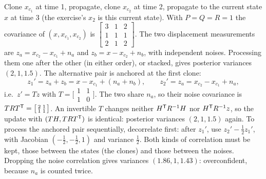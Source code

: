 \begin{solutions}
  \item Clone $x_{c_1}$ at time 1, propagate, clone $x_{c_2}$ at time 2, propagate to the current state $x$ at time 3 (the exercise's $x_2$ is this current state). With
        $P = Q = R = 1$ the covariance of $(x, x_{c_1}, x_{c_2})$ is $\left[\begin{smallmatrix} 3 & 1 & 2 \\ 1 & 1 & 1 \\ 2 & 1 & 2\end{smallmatrix}\right]$. The two displacement measurements
        are $z_a = x_{c_2} - x_{c_1} + n_a$ and $z_b = x - x_{c_2} + n_b$, with independent noises. Processing them one after the other (in either order), or stacked, gives
        posterior variances $(2, 1, 1.5)$. The alternative pair is anchored at the first clone:
        \[
          z_1' = z_a + z_b = x - x_{c_1} + (n_a + n_b), \qquad z_2' = z_a = x_{c_2} - x_{c_1} + n_a,
        \]
        i.e.\ $z' = Tz$ with $T = \big[\begin{smallmatrix} 1 & 1 \\ 1 & 0\end{smallmatrix}\big]$. The two share $n_a$, so their noise covariance is $TRT^{\mathsf{T}} = \big[\begin{smallmatrix} 2 & 1 \\ 1 & 1\end{smallmatrix}\big]$. An invertible
        $T$ changes neither $H^{\mathsf{T}} R^{-1} H$ nor $H^{\mathsf{T}} R^{-1} z$, so the update with $(TH, TRT^{\mathsf{T}})$ is identical: posterior variances $(2, 1, 1.5)$ again. To process the anchored pair
        sequentially, decorrelate first: after $z_1'$, use $z_2' - \tfrac12z_1'$, with Jacobian $(-\tfrac12, -\tfrac12, 1)$ and variance $\tfrac12$. Both kinds of correlation must be kept,
        those between the states (the clones) and those between the noises. Dropping the noise correlation gives variances $(1.86, 1, 1.43)$: overconfident, because
        $n_a$ is counted twice.


\end{solutions}
